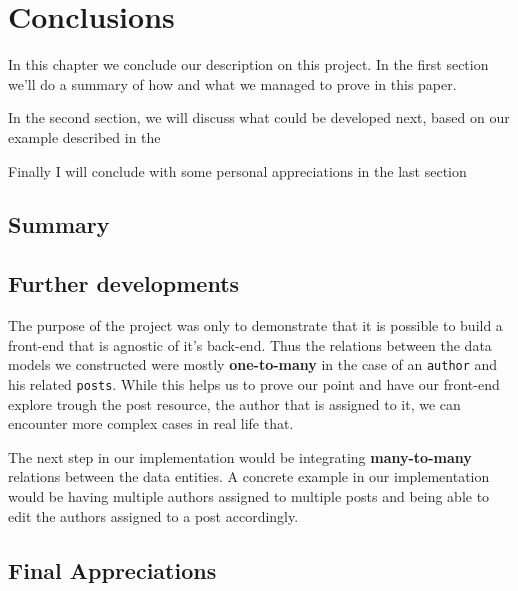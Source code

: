 \chapter{Conclusions}
\label{chapter:conclusions}

In this chapter we conclude our description on this project. In the first section  we'll do a summary of how and what we managed to prove in this paper.

In the second section,  we will discuss what could be developed next, based on our example described in the 

Finally I will conclude with some personal appreciations in the last section 

\section{Summary}
\label{sec:summary}


\section{Further developments}
\label{sec:further-developments}

The purpose of the project was only to demonstrate that it is possible to build a front-end that is agnostic of it's back-end. Thus the relations between the data models we constructed were mostly \textbf{one-to-many} in the case of an \texttt{author} and his related \texttt{posts}. While this helps us to prove our point and have our front-end explore trough the post resource, the author that is assigned to it, we can encounter more complex cases in real life that.

The next step in our implementation would be integrating \textbf{many-to-many} relations between the data entities. A concrete example in our implementation would be having multiple authors assigned to multiple posts and being able to edit the authors assigned to a post accordingly.

\section{Final Appreciations}
\label{sec:final-appreciations}

